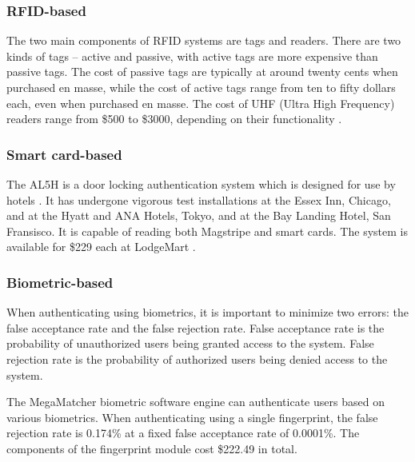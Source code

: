 \subsubsection{RFID-based}
The two main components of RFID systems are tags and readers. There are two kinds of tags -- active and passive, with active tags are more expensive than passive tags. The cost of passive tags are typically at around twenty cents when purchased en masse, while the cost of active tags range from ten to fifty dollars each, even when purchased en masse. The cost of UHF (Ultra High Frequency) readers range from \$500 to \$3000, depending on their functionality \cite{Violino2005}.

\subsubsection{Smart card-based}
The AL5H is a door locking authentication system which is designed for use by hotels \cite{MiwaLock}.  It has undergone vigorous test installations at the Essex Inn, Chicago, and at the Hyatt and ANA Hotels, Tokyo, and at the Bay Landing Hotel, San Fransisco. It is capable of reading both Magstripe and smart cards. The system is available for \$229 each at LodgeMart \cite{LodgemartMiwaLock}.

\subsubsection{Biometric-based}
When authenticating using biometrics, it is important to minimize two errors: the false acceptance rate and the false rejection rate. False acceptance rate is the probability of unauthorized users being granted access to the system. False rejection rate is the probability of authorized users being denied access to the system.

The MegaMatcher biometric software engine can authenticate users based on various biometrics. When authenticating using a single fingerprint, the false rejection rate is 0.174\% at a fixed false acceptance rate of 0.0001\%\cite{MegaMatcher}. The components of the fingerprint module cost \$222.49 in total\cite{MegaMatcherPrices}.


